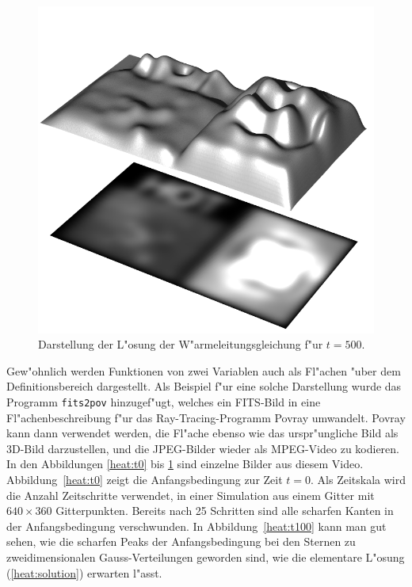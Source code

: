 %
\begin{figure}
\begin{center}
\includegraphics[width=\hsize]{heat/heat-i00500.png}
\end{center}
\caption{Darstellung der L"osung der W"armeleitungsgleichung
f"ur $t=500$.
\label{heat:t500}}
\end{figure}

Gew"ohnlich werden Funktionen von zwei Variablen auch als Fl"achen "uber
dem Definitionsbereich dargestellt.
Als Beispiel f"ur eine solche Darstellung wurde das Programm {\tt fits2pov} 
hinzugef"ugt, welches ein FITS-Bild in eine Fl"achenbeschreibung f"ur
das Ray-Tracing-Programm Povray umwandelt. Povray kann dann verwendet
werden, die Fl"ache ebenso wie das urspr"ungliche Bild als 3D-Bild
darzustellen, und die JPEG-Bilder wieder als MPEG-Video zu kodieren.
In den Abbildungen \ref{heat:t0} bis \ref{heat:t500} sind einzelne Bilder
aus diesem Video.
Abbildung~\ref{heat:t0} zeigt die Anfangsbedingung zur Zeit $t=0$.
Als Zeitskala wird die Anzahl Zeitschritte verwendet, in einer Simulation
aus einem Gitter mit $640\times 360$ Gitterpunkten.
Bereits nach 25 Schritten sind alle scharfen Kanten in der Anfangsbedingung
verschwunden.
In Abbildung~\ref{heat:t100} kann man gut sehen, wie die scharfen
Peaks der Anfangsbedingung bei den Sternen zu zweidimensionalen
Gauss-Verteilungen geworden sind, wie die elementare L"osung
(\ref{heat:solution}) erwarten l"asst.
